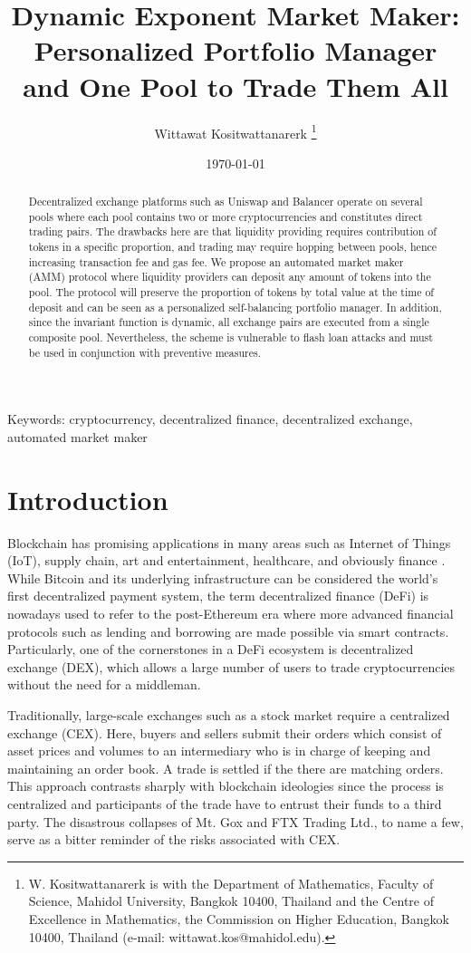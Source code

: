\documentclass[12pt,a4paper]{article}
\title{Dynamic Exponent Market Maker: Personalized Portfolio Manager and One Pool to Trade Them All}
\author{Wittawat Kositwattanarerk
\thanks{W. Kositwattanarerk is with the Department of Mathematics, Faculty of Science, Mahidol University, Bangkok 10400, Thailand and the Centre of Excellence in Mathematics, the Commission on Higher Education, Bangkok 10400, Thailand (e-mail: wittawat.kos@mahidol.edu).}}
\date{\today}
\begin{document}
\maketitle

\begin{abstract}
Decentralized exchange platforms such as Uniswap and Balancer operate on several pools where each pool contains two or more cryptocurrencies and constitutes direct trading pairs. The drawbacks here are that liquidity providing requires contribution of tokens in a specific proportion, and trading may require hopping between pools, hence increasing transaction fee and gas fee. We propose an automated market maker (AMM) protocol where liquidity providers can deposit any amount of tokens into the pool. The protocol will preserve the proportion of tokens by total value at the time of deposit and can be seen as a personalized self-balancing portfolio manager. In addition, since the invariant function is dynamic, all exchange pairs are executed from a single composite pool. Nevertheless, the scheme is vulnerable to flash loan attacks and must be used in conjunction with preventive measures.
\end{abstract}

Keywords: cryptocurrency, decentralized finance, decentralized exchange, automated market maker

\section{Introduction}

Blockchain has promising applications in many areas such as Internet of Things (IoT), supply chain, art and entertainment, healthcare, and obviously finance \cite{KHE,MMTL,PSS,USGB,ZMZZL}. While Bitcoin and its underlying infrastructure can be considered the world's first decentralized payment system, the term decentralized finance (DeFi) is nowadays used to refer to the post-Ethereum era where more advanced financial protocols such as lending and borrowing are made possible via smart contracts. Particularly, one of the cornerstones in a DeFi ecosystem is decentralized exchange (DEX), which allows a large number of users to trade cryptocurrencies without the need for a middleman.

Traditionally, large-scale exchanges such as a stock market require a centralized exchange (CEX). Here, buyers and sellers submit their orders which consist of asset prices and volumes to an intermediary who is in charge of keeping and maintaining an order book. A trade is settled if the there are matching orders. This approach contrasts sharply with blockchain ideologies since the process is centralized and participants of the trade have to entrust their funds to a third party. The disastrous collapses of Mt. Gox and FTX Trading Ltd., to name a few, serve as a bitter reminder of the risks associated with CEX.
\end{document}
